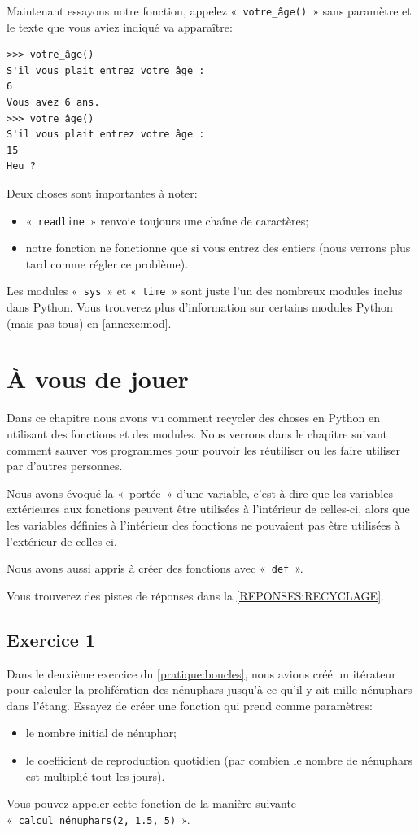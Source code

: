 Maintenant essayons notre fonction, appelez  «~\texttt{votre\_âge()}~» sans paramètre et le texte que vous aviez indiqué va apparaître:

\begin{Verbatim}[frame=single,rulecolor=\color{mbleu}, label=à taper]
>>> votre_âge()
S'il vous plait entrez votre âge :
6
Vous avez 6 ans.
>>> votre_âge()
S'il vous plait entrez votre âge :
15
Heu ?
\end{Verbatim}

Deux choses sont importantes à noter:
\begin{itemize}
\item «~\texttt{readline}~» renvoie toujours une chaîne de caractères;
\item notre fonction ne fonctionne que si vous entrez des entiers (nous verrons plus tard comme régler ce problème).
\end{itemize}

Les modules «~\texttt{sys}~»  et «~\texttt{time}~»  sont juste l'un des nombreux modules inclus dans Python. Vous trouverez plus d'information sur certains modules Python (mais pas tous) en \autoref{annexe:mod}.

\section{À vous de jouer\label{PRATIQUE:RECYCLAGE}}
Dans ce chapitre nous avons vu comment recycler des choses en Python en utilisant des fonctions et des modules.
Nous verrons dans le chapitre suivant comment sauver vos programmes pour pouvoir les réutiliser ou les faire utiliser par d'autres personnes.

Nous avons évoqué la «~portée~» d'une variable, c'est à dire que les variables extérieures aux fonctions peuvent être utilisées à l'intérieur de celles-ci, alors que les variables définies à l'intérieur des fonctions ne pouvaient pas être utilisées à l'extérieur de celles-ci.

Nous avons aussi appris à créer des fonctions avec «~\texttt{def}~».

Vous trouverez des pistes de réponses dans la \autoref{REPONSES:RECYCLAGE}.


\subsection{Exercice 1}
Dans le deuxième exercice du \autoref{pratique:boucles}, nous avions créé un itérateur pour calculer la prolifération des nénuphars jusqu'à ce qu'il y ait mille nénuphars dans l'étang.
Essayez de créer une fonction qui prend comme paramètres:
\begin{itemize}
\item le nombre initial de nénuphar;
\item le coefficient de reproduction quotidien (par combien le nombre de nénuphars est multiplié tout les jours).
\end{itemize}
Vous pouvez appeler cette fonction de la manière suivante «~\texttt{calcul\_nénuphars(2, 1.5, 5)}~».

